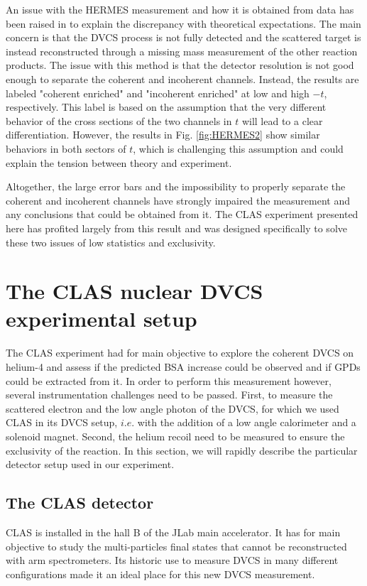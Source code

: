 \documentclass[aps,prc,preprint,superscriptaddress]{revtex4}
\begin{document}
An issue with the HERMES measurement and how it is obtained from data has been raised in
\cite{Guzey:2003jh} to explain the discrepancy with theoretical expectations.
The main concern is that the DVCS process is not fully detected and the scattered target
is instead reconstructed through a missing mass measurement of the other reaction products. The 
issue with this method is that the detector resolution is not good enough to separate the 
coherent and incoherent channels. 
Instead, the results are labeled "coherent enriched" and "incoherent enriched" at low and high 
$-t$, respectively. This label is based on the assumption that the very different behavior of the
cross sections of the two channels in $t$ will lead to a clear differentiation. However, the
results in Fig. \ref{fig:HERMES2} show similar behaviors in both sectors of $t$, which is 
challenging this assumption and could explain the tension between theory and experiment. 

Altogether, the large error bars and the impossibility to properly separate the coherent and 
incoherent channels have strongly impaired the measurement and any conclusions that could be
obtained from it. The CLAS experiment presented here has profited largely from this
result and was designed specifically to solve these two issues of low statistics and exclusivity.

\section{The CLAS nuclear DVCS experimental setup}

The CLAS experiment had for main objective to explore the coherent DVCS on helium-4 and assess if
the predicted BSA increase could be observed and if GPDs could be extracted from it. In order to
perform this measurement however, several instrumentation challenges need to be passed. First, to
measure the scattered electron and the low angle photon of the DVCS, for which we used CLAS in its 
DVCS setup, $i.e.$ with the addition of a low angle calorimeter and a solenoid magnet. Second, the
helium recoil need to be measured to ensure the exclusivity of the reaction. In this section, we 
will rapidly describe the particular detector setup used in our experiment. 

\subsection{The CLAS detector}

CLAS is installed in the hall B of the JLab main accelerator. It has for main objective to study the 
multi-particles final states
that cannot be reconstructed with arm spectrometers. Its historic use to measure DVCS in many different 
configurations made it an ideal place for this new DVCS measurement.  
\end{document}
